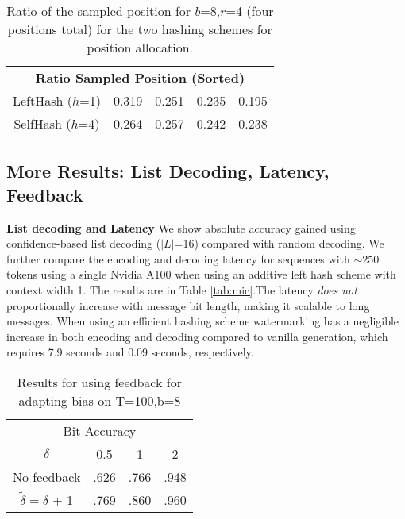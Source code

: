 \begin{table}[t]
    \centering
    \begin{tabular}{c|cccc}
        \toprule
        \multicolumn{5}{c}{\textbf{Ratio Sampled Position (Sorted)}} \\ 
        LeftHash ($h$=1) & 0.319	& 0.251 & 0.235 & 0.195 \\
        SelfHash ($h$=4) & 0.264    & 0.257 & 0.242 & 0.238  \\ 
        \bottomrule
    \end{tabular}
    \caption{Ratio of the sampled position for $b$=8,$r$=4 (four positions total) for the two hashing schemes for position allocation. 
}  \label{tab:hashing-scheme-pos-ratio}
\end{table}



\subsection{More Results: List Decoding, Latency, Feedback}\label{appendix:misc-results}
\textbf{List decoding and Latency}
We show absolute accuracy gained using confidence-based list decoding ($|L|$=16) compared with random decoding. We further compare the encoding and decoding latency for sequences with $\sim 250$ tokens using a single Nvidia A100 when using an additive left hash scheme with context width 1. The results are in Table \ref{tab:mic}.The latency \textit{does not} proportionally increase with message bit length, making it scalable to long messages. When using an efficient hashing scheme watermarking has a negligible increase in both encoding and decoding compared to vanilla generation, which requires 7.9 seconds and 0.09 seconds, respectively. 


\begin{wraptable}{R}{0.4\textwidth}
    \begin{tabular}{c|ccc}
    \toprule

    \multicolumn{4}{c}{Bit Accuracy} \\ 
        $\delta$    & 0.5  &  1  &  2 \\
    \toprule
    No feedback & .626  &  .766  & .948  \\  
    $\tilde \delta=\delta$ + 1 & .769 & .860 & .960  \\
    \bottomrule
\end{tabular}
\caption{Results for using feedback for adapting bias on T=100,b=8}
\label{tab:adaptive-bias}
\end{wraptable}

